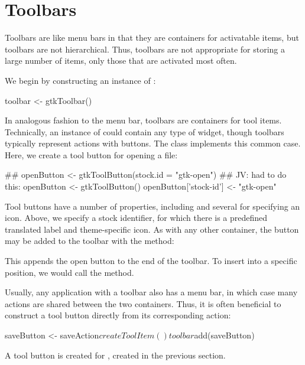\section{Toolbars}
\label{sec:RGtk2:toolbars}

Toolbars are like menu bars in that they are containers for
activatable items, but toolbars are not hierarchical. Thus, toolbars
are not appropriate for storing a large number of items, only those
that are activated most often.

We begin by constructing an instance of :
\begin{Schunk}
\begin{Sinput}
 toolbar <- gtkToolbar()
\end{Sinput}
\end{Schunk}

In analogous fashion to the menu bar, toolbars are containers for tool
items. Technically, an instance of  could contain
any type of widget, though toolbars typically represent actions
with buttons. The  class implements this common
case.  Here, we create a tool button for opening a file:
\begin{Schunk}
\begin{Sinput}
 ## openButton <-  gtkToolButton(stock.id = "gtk-open") 
 ## JV: had to do this:
 openButton <- gtkToolButton()
 openButton['stock-id'] <- "gtk-open"
\end{Sinput}
\end{Schunk}
%
Tool buttons have a number of properties, including  and
several for specifying an icon. Above, we specify a stock identifier,
for which there is a predefined translated label and theme-specific icon.
As with any other container, the button may be added to the toolbar with
the  method:
\begin{Schunk}
\end{Schunk}
%
This appends the open button to the end of the toolbar. To insert into
a specific position, we would call the  method.

Usually, any application with a toolbar also has a menu bar, in which
case many actions are shared between the two containers. Thus, it is
often beneficial to construct a tool button directly from its
corresponding action:
\begin{Schunk}
\begin{Sinput}
 saveButton <- saveAction$createToolItem()
 toolbar$add(saveButton)
\end{Sinput}
\end{Schunk}
%
A tool button is created for , created in the
previous section.

